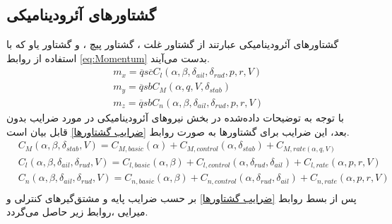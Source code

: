\subsection{گشتاورهای آئرودینامیکی}
گشتاورهای آئرودینامیکی عبارتند از گشتاور غلت
، گشتاور پیچ
 ، و گشتاور یاو
  که با استفاده از روابط \eqref{eq:Momentum} بدست می‌آیند.
\begin{equation}\label{eq:Momentum}
\begin{split}
&m_x= \overline{q}s\overline{c}C_{l}(\alpha,\beta,\delta_{ail},\delta_{rud},p,r,V)\\
&m_y= \overline{q}sbC_{M}(\alpha ,q,V,\delta_{stab})\\
&m_z= \overline{q}sbC_{n}(\alpha,\beta,\delta_{ail},\delta_{rud},p,r,V)
\end{split}
\end{equation}
با توجه به توضیحات داده‌شده در بخش نیروهای آئرودینامیکی در مورد ضرایب بدون بعد، این ضرایب برای گشتاورها به صورت روابط \eqref{ضرایب گشتاورها}  قابل بیان است.
\begin{equation}\label{ضرایب گشتاورها}
\begin{split}
&C_{M}(\alpha,\beta,\delta_{stab},V)=C_{M,basic}(\alpha)+C_{M,control}(\alpha,\delta_{stab})+C_{M,rate(\alpha ,q,V)}\\
&C_{l}(\alpha,\beta,\delta_{ail},\delta_{rud},V)=C_{l,basic}(\alpha,\beta)+C_{l,control}(\alpha,\delta_{rud},\delta_{ail})+C_{l,rate}(\alpha ,p,r,V)\\
&C_{n}(\alpha,\beta,\delta_{ail},\delta_{rud},V)=C_{n,basic}(\alpha,\beta)+C_{n,control}(\alpha,\delta_{rud},\delta_{ail})+C_{n,rate}(\alpha ,p,r,V)\\
\end{split}
\end{equation}
پس از بسط روابط  \eqref{ضرایب گشتاورها} بر حسب ضرایب پایه و مشتق‌گیرهای کنترلی و میرایی ،روابط  زیر حاصل می‌گردد.
